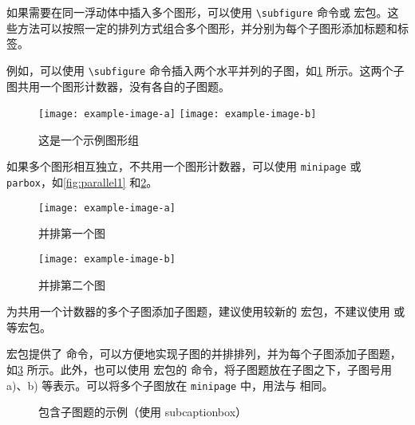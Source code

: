 如果需要在同一浮动体中插入多个图形，可以使用 \verb|\subfigure| 命令或  宏包。这些方法可以按照一定的排列方式组合多个图形，并分别为每个子图形添加标题和标签。

例如，可以使用 \verb|\subfigure| 命令插入两个水平并列的子图，如\cref{fig:example-subfig-1} 所示。这两个子图共用一个图形计数器，没有各自的子图题。

\begin{figure}[!htp]
    \centering
    \texttt{[image: example-image-a]}
    \hspace{1cm}
    \texttt{[image: example-image-b]}
    \caption{这是一个示例图形组}
    \label{fig:example-subfig-1}
\end{figure}

如果多个图形相互独立，不共用一个图形计数器，可以使用 \texttt{minipage} 或 \texttt{parbox}，如\cref{fig:parallel1} 和\cref{fig:parallel2}。

\begin{figure}[!htp]
    \begin{minipage}{0.4\textwidth}
        \centering
        \texttt{[image: example-image-a]}
        \caption{并排第一个图}
        \label{fig:parallel1}
    \end{minipage}\hfill
    \begin{minipage}{0.4\textwidth}
        \centering
        \texttt{[image: example-image-b]}
        \caption{并排第二个图}
        \label{fig:parallel2}
    \end{minipage}
\end{figure}

为共用一个计数器的多个子图添加子图题，建议使用较新的  宏包，不建议使用  或  等宏包。

 宏包提供了  命令，可以方便地实现子图的并排排列，并为每个子图添加子图题，如\cref{fig:subcaptionbox} 所示。此外，也可以使用  宏包的  命令，将子图题放在子图之下，子图号用 a)、b) 等表示。可以将多个子图放在 \texttt{minipage} 中，用法与  相同。

\begin{figure}[!htp]
    \centering
    \hspace{1cm}
    \caption{包含子图题的示例（使用 subcaptionbox）}
    \label{fig:subcaptionbox}
\end{figure}

